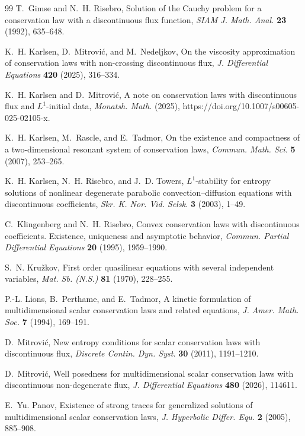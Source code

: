 \documentclass[11pt]{amsart}
\numberwithin{equation}{section}
\theoremstyle{plain}
\theoremstyle{definition}
\theoremstyle{remark}
\begin{document}
\begin{thebibliography}{99}
T.~Gimse and N.~H. Risebro,
Solution of the Cauchy problem for a conservation law with a discontinuous flux function,
\emph{SIAM J. Math. Anal.} \textbf{23} (1992), 635--648.

K.~H. Karlsen, D.~Mitrovi\'c, and M.~Nedeljkov,
On the viscosity approximation of conservation laws with non-crossing discontinuous flux,
\emph{J. Differential Equations} \textbf{420} (2025), 316--334.

K.~H. Karlsen and D.~Mitrovi\'c,
A note on conservation laws with discontinuous flux and \(L^1\)-initial data,
\emph{Monatsh. Math.} (2025),
https://doi.org/10.1007/s00605-025-02105-x.

K.~H. Karlsen, M.~Rascle, and E.~Tadmor,
On the existence and compactness of a two-dimensional resonant system of conservation laws,
\emph{Commun. Math. Sci.} \textbf{5} (2007), 253--265.

K.~H. Karlsen, N.~H. Risebro, and J.~D. Towers,
\(L^1\)-stability for entropy solutions of nonlinear degenerate parabolic convection--diffusion equations with discontinuous coefficients,
\emph{Skr. K. Nor. Vid. Selsk.} \textbf{3} (2003), 1--49.

C.~Klingenberg and N.~H. Risebro,
Convex conservation laws with discontinuous coefficients. Existence, uniqueness and asymptotic behavior,
\emph{Commun. Partial Differential Equations} \textbf{20} (1995), 1959--1990.


S.~N. Kru\v{z}kov,
First order quasilinear equations with several independent variables,
\emph{Mat. Sb. (N.S.)} \textbf{81} (1970), 228--255.

P.-L. Lions, B.~Perthame, and E.~Tadmor,
A kinetic formulation of multidimensional scalar conservation laws and related equations,
\emph{J. Amer. Math. Soc.} \textbf{7} (1994), 169--191.

D.~Mitrovi\'c,
New entropy conditions for scalar conservation laws with discontinuous flux,
\emph{Discrete Contin. Dyn. Syst.} \textbf{30} (2011), 1191--1210.

D.~Mitrovi\'c,
Well posedness for multidimensional scalar conservation laws with discontinuous non-degenerate flux,
\emph{J. Differential Equations} \textbf{480} (2026), 114611.

E.~Yu. Panov,
Existence of strong traces for generalized solutions of multidimensional scalar conservation laws,
\emph{J. Hyperbolic Differ. Equ.} \textbf{2} (2005), 885--908.


\end{thebibliography}
\end{document}
